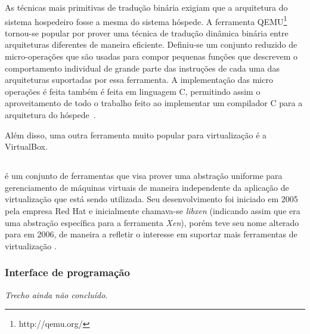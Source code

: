 As técnicas mais primitivas de tradução binária exigiam que a arquitetura
do sistema hospedeiro fosse a mesma do sistema hóspede. A ferramenta
QEMU\footnote{http://qemu.org/} tornou-se popular por prover uma técnica de
tradução dinâmica binária entre arquiteturas diferentes de maneira
eficiente. Definiu-se um conjunto reduzido de micro-operações que
são usadas para compor pequenas funções que descrevem o comportamento
individual de grande parte das instruções de cada uma das arquiteturas
suportadas por essa ferramenta. A implementação das micro operações é feita
também é feita em linguagem C, permitindo assim o aproveitamento de todo o
trabalho feito ao implementar um compilador C para a arquitetura do
hóspede~\cite{bellard2005qemu}.

Além disso, uma outra ferramenta muito popular para virtualização é a
VirtualBox.




\subsection{\libvirt}\label{sec:libvirt}


\libvirt{} é um conjunto de ferramentas que visa prover uma abstração
uniforme para gerenciamento de máquinas virtuais de maneira independente 
da aplicação de virtualização que está sendo utilizada. Seu desenvolvimento
foi iniciado em 2005 pela empresa Red Hat e inicialmente chamava-se
\emph{libxen} (indicando assim que era uma abstração específica para a
ferramenta \emph{Xen}), porém teve seu nome alterado para \libvirt{} em
2006, de maneira a refletir o interesse em suportar mais ferramentas de
virtualização .

\subsubsection{Interface de programação}\label{sec:libvirtapi}

\emph{Trecho ainda não concluído}.
